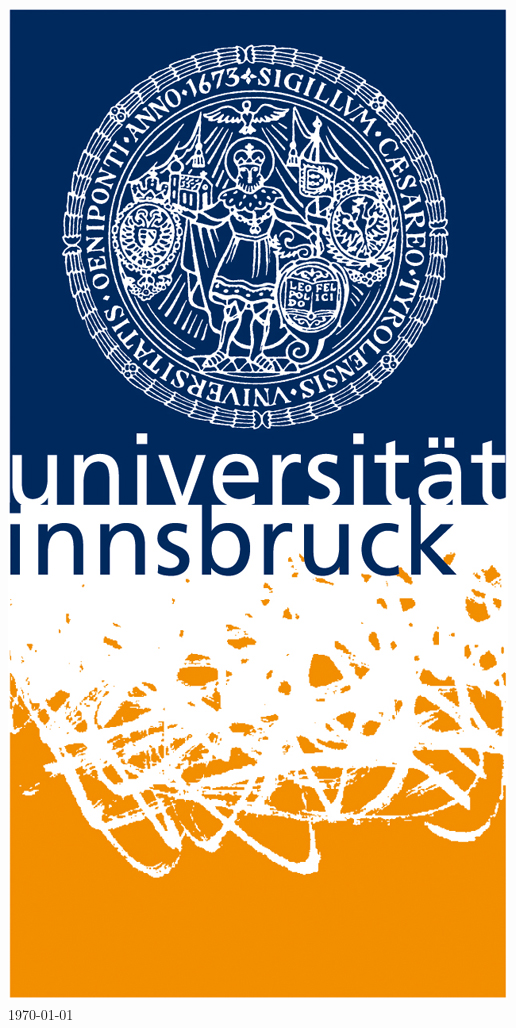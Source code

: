 \documentclass[10pt,a4paper]{book}
\numberwithin{equation}{chapter}
\numberwithin{figure}{chapter}
\numberwithin{table}{chapter}
\begin{document}
\begin{titlepage}
\begin{center}
\includegraphics[scale=0.8]{UIBK.jpg}\\[1cm] %
{\large \today}\\[4cm] %

\end{center}
\end{titlepage}
\end{document}
